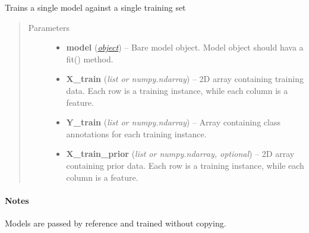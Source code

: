 \documentclass[letterpaper,10pt,english]{sphinxmanual}
\begin{document}
\begin{fulllineitems}
\label{classification:flamingo.classification.models.train_model}
Trains a single model against a single training set
\begin{quote}\begin{description}
\item[{Parameters}] \leavevmode\begin{itemize}
\item {} 
\textbf{model} (\href{http://docs.python.org/library/functions.html\#object}{\emph{object}}) -- Bare model object. Model object should hava a fit() method.

\item {} 
\textbf{X\_train} (\emph{list or numpy.ndarray}) -- 2D array containing training data. Each row is a training
instance, while each column is a feature.

\item {} 
\textbf{Y\_train} (\emph{list or numpy.ndarray}) -- Array containing class annotations for each training instance.

\item {} 
\textbf{X\_train\_prior} (\emph{list or numpy.ndarray, optional}) -- 2D array containing prior data. Each row is a training
instance, while each column is a feature.

\end{itemize}

\end{description}\end{quote}
\paragraph{Notes}

Models are passed by reference and trained without copying.

\end{fulllineitems}

\end{document}
